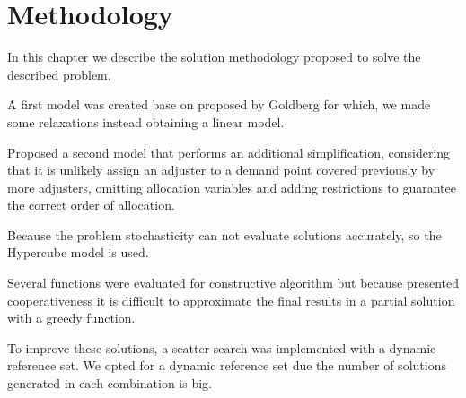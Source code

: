 \chapter{Methodology}
In this chapter
we describe the solution methodology proposed
to solve the described problem.

A first model was created
base on proposed by Goldberg \cite{goldberg1990validating}
for which,
we made some relaxations
instead obtaining a linear model.

Proposed a second model
that performs an additional simplification,
considering that
it is unlikely
assign an adjuster
to a demand point
covered previously
by more adjusters,
omitting allocation variables
and adding restrictions
to guarantee
the correct order of allocation.

Because the problem stochasticity
can not evaluate solutions accurately,
so the Hypercube model is used.

Several functions were evaluated
for constructive algorithm
but because presented cooperativeness
it is difficult
to approximate the final results
in a partial solution
with a greedy function.

To improve these solutions,
a scatter-search was implemented
with a dynamic reference set.
We opted for a dynamic reference set
due the number of solutions generated
in each combination is big.

